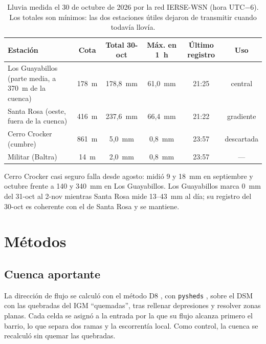 \documentclass{sosg-informe}
\begin{document}
\begin{table}[ht]
  \centering\small
  \caption{Lluvia medida el 30 de octubre de 2026 por la red IERSE-WSN (hora UTC$-6$). Los totales son mínimos: las dos estaciones útiles dejaron de transmitir cuando todavía llovía.}
  \label{tab:lluvia}
  \begin{tabularx}{\linewidth}{>{\raggedright\arraybackslash}Xccccc}
    \toprule
    Estación & Cota & Total 30-oct & Máx. en 1~h & Último registro & Uso \\
    \midrule
    Los Guayabillos (parte media, a 370~m de la cuenca) & 178~m & 178,8~mm & 61,0~mm & 21:25 & central \\
    Santa Rosa (oeste, fuera de la cuenca) & 416~m & 237,6~mm & 66,4~mm & 21:22 & gradiente \\
    Cerro Crocker (cumbre) & 861~m & 5,0~mm & 0,8~mm & 23:57 & descartada \\
    Militar (Baltra) & 14~m & 2,0~mm & 0,8~mm & 23:57 & --- \\
    \bottomrule
  \end{tabularx}
  \par\vspace{3pt}\raggedright\footnotesize Cerro Crocker casi seguro falla desde agosto: midió 9 y 18~mm en septiembre y octubre frente a 140 y 340~mm en Los Guayabillos. Los Guayabillos marca 0~mm del 31-oct al 2-nov mientras Santa Rosa mide 13--43~mm al día; su registro del 30-oct es coherente con el de Santa Rosa y se mantiene.
\end{table}

\section{Métodos}

\subsection{Cuenca aportante}
La dirección de flujo se calculó con el método D8 \citep{ocallaghan1984}, con \texttt{pysheds} \citep{bartos2020}, sobre el DSM con las quebradas del IGM \enquote{quemadas}, tras rellenar depresiones y resolver zonas planas. Cada celda se asignó a la entrada por la que su flujo alcanza primero el barrio, lo que separa dos ramas y la escorrentía local. Como control, la cuenca se recalculó sin quemar las quebradas.
\end{document}
